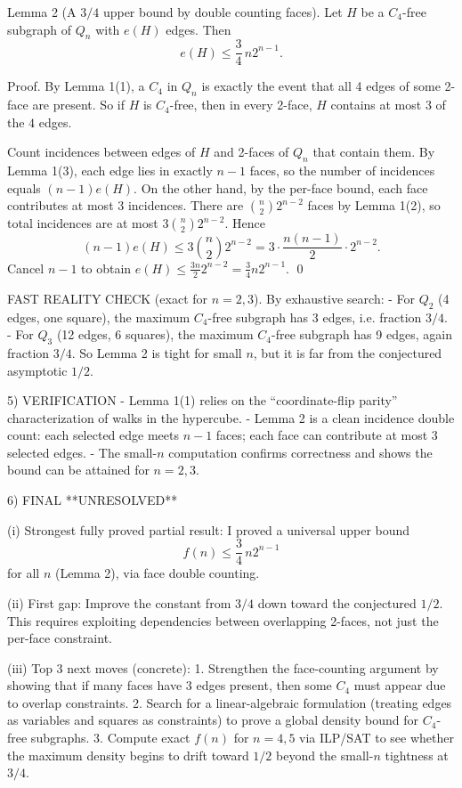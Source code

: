 Lemma 2 (A $3/4$ upper bound by double counting faces).
Let $H$ be a $C_4$-free subgraph of $Q_n$ with $e(H)$ edges. Then
\[e(H)\le \frac34\, n2^{n-1}.\]

Proof.
By Lemma 1(1), a $C_4$ in $Q_n$ is exactly the event that all 4 edges of some 2-face are present.
So if $H$ is $C_4$-free, then in every 2-face, $H$ contains at most $3$ of the $4$ edges.

Count incidences between edges of $H$ and 2-faces of $Q_n$ that contain them.
By Lemma 1(3), each edge lies in exactly $n-1$ faces, so the number of incidences equals $(n-1)e(H)$.
On the other hand, by the per-face bound, each face contributes at most $3$ incidences.
There are $\binom{n}{2}2^{n-2}$ faces by Lemma 1(2), so total incidences are at most $3\binom{n}{2}2^{n-2}$.
Hence
\[(n-1)e(H)\le 3\binom{n}{2}2^{n-2} = 3\cdot \frac{n(n-1)}{2}\cdot 2^{n-2}.\]
Cancel $n-1$ to obtain $e(H)\le \frac{3n}{2}2^{n-2}=\frac34 n2^{n-1}$. \qed

FAST REALITY CHECK (exact for $n=2,3$).
By exhaustive search:
- For $Q_2$ (4 edges, one square), the maximum $C_4$-free subgraph has 3 edges, i.e. fraction $3/4$.
- For $Q_3$ (12 edges, 6 squares), the maximum $C_4$-free subgraph has 9 edges, again fraction $3/4$.
So Lemma 2 is tight for small $n$, but it is far from the conjectured asymptotic $1/2$.

5) VERIFICATION
- Lemma 1(1) relies on the ``coordinate-flip parity'' characterization of walks in the hypercube.
- Lemma 2 is a clean incidence double count: each selected edge meets $n-1$ faces; each face can contribute at most 3 selected edges.
- The small-$n$ computation confirms correctness and shows the bound can be attained for $n=2,3$.

6) FINAL
**UNRESOLVED**

(i) Strongest fully proved partial result:
I proved a universal upper bound
\[f(n)\le \frac34\,n2^{n-1}\]
for all $n$ (Lemma 2), via face double counting.

(ii) First gap:
Improve the constant from $3/4$ down toward the conjectured $1/2$.
This requires exploiting dependencies between overlapping 2-faces, not just the per-face constraint.

(iii) Top 3 next moves (concrete):
1. Strengthen the face-counting argument by showing that if many faces have 3 edges present, then some $C_4$ must appear due to overlap constraints.
2. Search for a linear-algebraic formulation (treating edges as variables and squares as constraints) to prove a global density bound for $C_4$-free subgraphs.
3. Compute exact $f(n)$ for $n=4,5$ via ILP/SAT to see whether the maximum density begins to drift toward $1/2$ beyond the small-$n$ tightness at $3/4$.

